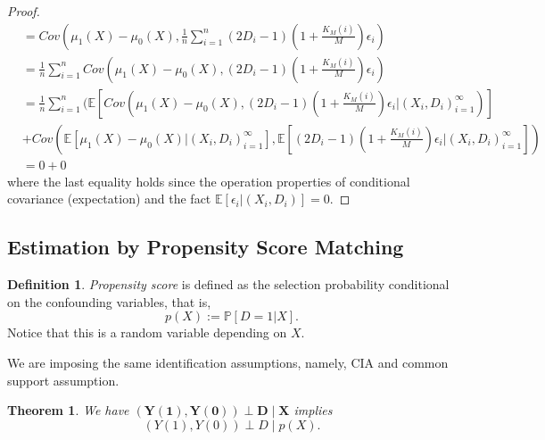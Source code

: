 \documentclass[11pt,a4paper]{amsart}
\theoremstyle{plain}
\newtheorem{theorem}{Theorem}
\theoremstyle{definition}
\newtheorem{definition}{Definition}
\begin{document}
\begin{proof}
\[\begin{aligned}
			&= Cov\left(\mu_{1}(X)-\mu_{0}(X), \frac{1}{n}\sum_{i=1}^{n}(2D_{i}-1)(1+\frac{K_{M}(i)}{M})\epsilon_{i}\right)\\
			&= \frac{1}{n}\sum_{i=1}^{n} Cov\left(\mu_{1}(X)-\mu_{0}(X), (2D_{i}-1)(1+\frac{K_{M}(i)}{M})\epsilon_{i}\right)	\\
			&= \frac{1}{n}\sum_{i=1}^{n} \big( \mathbb{E}\left[Cov\left(\mu_{1}(X)-\mu_{0}(X), (2D_{i}-1)(1+\frac{K_{M}(i)}{M})\epsilon_{i} \big| (X_{i},D_{i})_{i=1}^{\infty}\right) \right]	\\
			&+ Cov\left(\mathbb{E}[\mu_{1}(X)-\mu_{0}(X)\big| (X_{i},D_{i})_{i=1}^{\infty}], \mathbb{E}[(2D_{i}-1)(1+\frac{K_{M}(i)}{M})\epsilon_{i} \big| (X_{i},D_{i})_{i=1}^{\infty}]\right)	\\
			&= 0 + 0
		\end{aligned}	\]
		where the last equality holds since the operation properties of conditional covariance (expectation) and the fact $\mathbb{E}[\epsilon_{i}|(X_{i},D_{i})] = 0$.
	\end{proof} 

\subsection{Estimation by Propensity Score Matching}
	\begin{definition}
		\textit{Propensity score} is deﬁned as the selection probability conditional on the confounding variables, that is,
		\[	p(X) := \mathbb{P}[D=1 | X].	\]
	Notice that this is a random variable depending on $X$.
	\end{definition}
	We are imposing the same identiﬁcation assumptions, namely, CIA and common support assumption.\par
	\begin{theorem}\label{prop score, inde.}
		We have $(\boldsymbol{Y}(\mathbf{1}), \boldsymbol{Y}(\mathbf{0})) \perp \boldsymbol{D} \mid \boldsymbol{X}$ implies
		\[
		(Y(1), Y(0)) \perp D \mid p(X) .
		\]
	\end{theorem}
	
\end{document}
